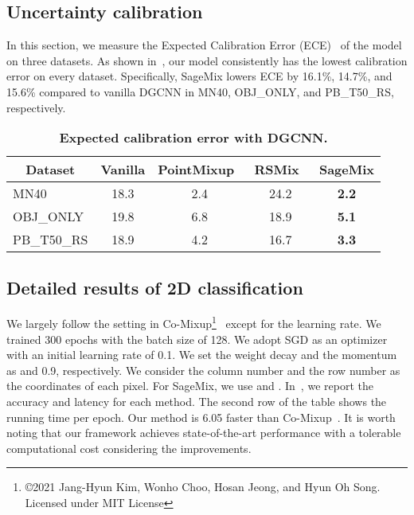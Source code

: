 \documentclass{article}
\begin{document}
\subsection{Uncertainty calibration}
\label{sec:calibration}
In this section, we measure the Expected Calibration Error (ECE)~\cite{guo2017calibration} of the model on three datasets.
As shown in~, our model consistently has the lowest calibration error on every dataset. Specifically, SageMix lowers ECE by 16.1\%, 14.7\%, and 15.6\% compared to vanilla DGCNN in MN40, OBJ\_ONLY, and PB\_T50\_RS, respectively.  

\begin{table}[h!]
  \centering 
  \setlength{\tabcolsep}{5pt}
  \caption{\textbf{Expected calibration error with DGCNN.}}
  \label{table:calibration} 
  \begin{tabular}{l|ccc|c}
  \toprule
  \multicolumn{1}{c|}{\textbf{Dataset}} & Vanilla& PointMixup~\cite{chen2020pointmixup} & RSMix~\cite{lee2021regularization} & \textbf{SageMix}\\

  \midrule
  \midrule
  MN40& 18.3&2.4&24.2&\textbf{2.2}\\
  OBJ\_ONLY & 19.8 & 6.8 & 18.9 & \textbf{5.1}\\
  PB\_T50\_RS& 18.9 &4.2&16.7&\textbf{3.3} \\
  \bottomrule
  \end{tabular}
  
  
\end{table}  
\subsection{Detailed results of 2D classification}
\label{sec:detailed2D}
We largely follow the setting in Co-Mixup\footnote{\copyright 2021 Jang-Hyun Kim, Wonho Choo, Hosan Jeong, and Hyun Oh Song. Licensed under MIT License}~\cite{DBLP:conf/iclr/KimCJS21} except for the learning rate. We trained 300 epochs with the batch size of 128. We adopt SGD as an optimizer with an initial learning rate of 0.1. We set the weight decay and the momentum as  and 0.9, respectively. We consider the column number and the row number as the coordinates of each pixel.
For SageMix, we use  and  .
In~, we report the accuracy and latency for each method. The second row of the table shows the running time per epoch. Our method is 6.05 faster than Co-Mixup~\cite{DBLP:conf/iclr/KimCJS21}. 
It is worth noting that our framework achieves state-of-the-art performance with a tolerable computational cost considering the improvements.
\end{document}
